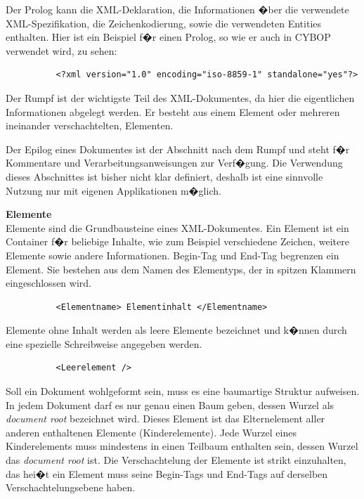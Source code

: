         Der Prolog kann die XML-Deklaration, die Informationen 
        �ber die verwendete XML-Spezifikation, die Zeichenkodierung, sowie die verwendeten 
        Entities enthalten. Hier ist ein Beispiel f�r einen Prolog, so wie er auch in 
        CYBOP verwendet wird, zu sehen:
\begin{verbatim}
          <?xml version="1.0" encoding="iso-8859-1" standalone="yes"?>
\end{verbatim}

        Der Rumpf ist der wichtigste Teil des XML-Dokumentes, da hier die eigentlichen
        Informationen abgelegt werden. Er besteht aus einem Element oder mehreren ineinander
        verschachtelten, Elementen.

        Der Epilog eines Dokumentes ist der Abschnitt nach dem Rumpf und steht f�r 
        Kommentare und Verarbeitungsanweisungen zur 
        Verf�gung. Die Verwendung dieses Abschnittes ist bisher nicht klar definiert, 
        deshalb ist eine sinnvolle Nutzung nur mit eigenen Applikationen m�glich.
      
      \textbf{Elemente} \\
        Elemente sind die Grundbausteine eines XML-Dokumentes. Ein Element ist ein Container
        f�r beliebige Inhalte, wie zum Beispiel verschiedene Zeichen, weitere Elemente sowie andere
        Informationen. Begin-Tag und End-Tag begrenzen ein Element. Sie bestehen aus dem Namen
        des Elementyps, der in spitzen Klammern eingeschlossen wird. 
\begin{verbatim}
          <Elementname> Elementinhalt </Elementname>
\end{verbatim}
        Elemente ohne Inhalt werden als leere Elemente bezeichnet und k�nnen durch eine
        spezielle Schreibweise angegeben werden.
\begin{verbatim}
          <Leerelement />
\end{verbatim}
        Soll ein Dokument wohlgeformt sein, muss es eine baumartige Struktur aufweisen. In
        jedem Dokument darf es nur genau einen Baum geben, dessen Wurzel als \emph{document root}
        bezeichnet wird. Dieses Element ist das Elternelement aller anderen
        enthaltenen Elemente (Kinderelemente). Jede Wurzel eines Kinderelements muss 
        mindestens in einen Teilbaum enthalten sein, dessen Wurzel das \emph{document root} ist. 
        Die Verschachtelung der Elemente ist strikt
        einzuhalten, das hei�t ein Element muss seine Begin-Tags und End-Tags auf derselben
        Verschachtelungsebene haben.
      
